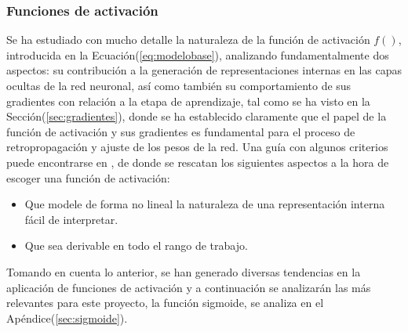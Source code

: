         \subsubsection{Funciones de activación}
        Se ha estudiado con mucho detalle la naturaleza de la función de activación $f()$, introducida en la 
        Ecuación(\ref{eq:modelobase}), analizando fundamentalmente dos aspectos: su contribución a la generación 
        de representaciones internas en las capas ocultas de la red neuronal, así como también su comportamiento 
        de sus gradientes con relación a la etapa de aprendizaje, tal como se ha visto en la Sección(\ref{sec:gradientes}), 
        donde se ha establecido claramente que el papel de la función de activación y sus gradientes es fundamental para 
        el proceso de retropropagación y ajuste de los pesos de la red. Una guía con algunos criterios puede 
        encontrarse en \cite{mhaskar1994choose}, de donde se rescatan los siguientes aspectos a la hora de escoger una 
        función de activación:
        \begin{itemize}
            \item Que modele de forma no lineal la naturaleza de una representación interna fácil de interpretar.
            \item Que sea derivable en todo el rango de trabajo.
        \end{itemize}

        Tomando en cuenta lo anterior, se han generado diversas tendencias en la aplicación de funciones de activación y a 
        continuación se analizarán las más relevantes para este proyecto, la función sigmoide, se analiza en el Apéndice(\ref{sec:sigmoide}).

